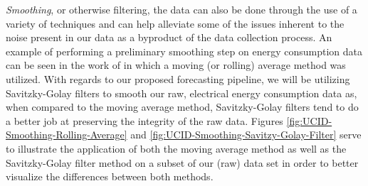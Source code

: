 \begin{adjustwidth}{-1.65cm}{-0.0cm}
\begin{enumerate}[label=Step 3.\arabic*:, leftmargin=*]
    \noindent \newline \textit{Smoothing}, or otherwise filtering, the data can also be done through the use of a variety of techniques and can help alleviate some of the issues inherent to the noise present in our data as a byproduct of the data collection process. An example of performing a preliminary smoothing step on energy consumption data can be seen in the work of \citet{Hsiao} in which a moving (or rolling) average method was utilized. With regards to our proposed forecasting pipeline, we will be utilizing Savitzky-Golay filters to smooth our raw, electrical energy consumption data as, when compared to the moving average method, Savitzky-Golay filters tend to do a better job at preserving the integrity of the raw data.  Figures \ref{fig:UCID-Smoothing-Rolling-Average} and \ref{fig:UCID-Smoothing-Savitzy-Golay-Filter} serve to illustrate the application of both the moving average method as well as the Savitzky-Golay filter method on a subset of our (raw) data set in order to better visualize the differences between both methods.
    

\end{enumerate}
\end{adjustwidth}
